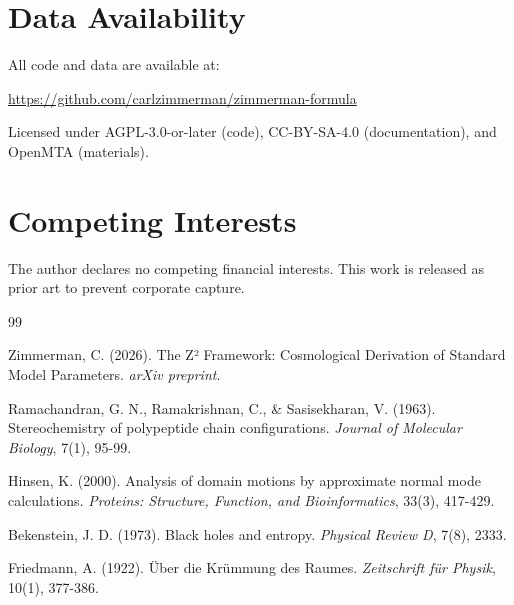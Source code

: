 \documentclass[11pt,a4paper]{article}
\theoremstyle{plain}
\theoremstyle{definition}
\theoremstyle{remark}
\begin{document}
\section*{Data Availability}

All code and data are available at:
\begin{center}
\url{https://github.com/carlzimmerman/zimmerman-formula}
\end{center}

Licensed under AGPL-3.0-or-later (code), CC-BY-SA-4.0 (documentation), and OpenMTA (materials).

\section*{Competing Interests}

The author declares no competing financial interests. This work is released as prior art to prevent corporate capture.


\begin{thebibliography}{99}

Zimmerman, C. (2026). The Z² Framework: Cosmological Derivation of Standard Model Parameters. \textit{arXiv preprint}.

Ramachandran, G. N., Ramakrishnan, C., \& Sasisekharan, V. (1963). Stereochemistry of polypeptide chain configurations. \textit{Journal of Molecular Biology}, 7(1), 95-99.

Hinsen, K. (2000). Analysis of domain motions by approximate normal mode calculations. \textit{Proteins: Structure, Function, and Bioinformatics}, 33(3), 417-429.

Bekenstein, J. D. (1973). Black holes and entropy. \textit{Physical Review D}, 7(8), 2333.

Friedmann, A. (1922). Über die Krümmung des Raumes. \textit{Zeitschrift für Physik}, 10(1), 377-386.

\end{thebibliography}
\end{document}
